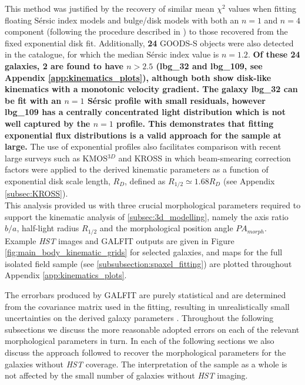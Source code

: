 \documentclass[fleqn,usenatbib]{mnras}
\newcommand{\Sers}{S\'{e}rsic }
\begin{document}
This method was justified by the recovery of similar mean $\chi^{2}$ values when fitting floating \Sers index models and bulge/disk models with both an $n=1$ and $n=4$ component (following the procedure described in \citealt{Bruce2012}) to those recovered from the fixed exponential disk fit.
Additionally, \textbf{24} GOODS-S objects were also detected in the \cite{VanderWel2012} catalogue, for which the median \Sers index value is $n=1.2$.
\textbf{Of these 24 galaxies, 2 are found to have $n>2.5$ (lbg\_32 and lbg\_109, see Appendix \ref{app:kinematics_plots}), although both show disk-like kinematics with a monotonic velocity gradient.
The galaxy lbg\_32 can be fit with an $n=1$ \Sers profile with small residuals, however lbg\_109 has a centrally concentrated light distribution which is not well captured by the $n=1$ profile.
This demonstrates that fitting exponential flux distributions is a valid approach for the sample at large.}
The use of exponential profiles also facilitates comparison with recent large surveys such as KMOS$^{3D}$ \citep{Wisnioski2015} and KROSS \citep{Harrison2017} in which beam-smearing correction factors were applied to the derived kinematic parameters as a function of exponential disk scale length, $R_{D}$, defined as $R_{1/2}\simeq1.68 R_{D}$ (see Appendix \ref{subsec:KROSS}). \\


This analysis provided us with three crucial morphological parameters required to support the kinematic analysis of \cref{subsec:3d_modelling}, namely the axis ratio $b/a$, half-light radius $R_{1/2}$ and the morphological position angle $PA_{morph}$.
Example {\em HST} images and {\scriptsize GALFIT} outputs are given in Figure \ref{fig:main_body_kinematic_grids} for selected galaxies, and maps for the full isolated field sample (see \cref{subsubsection:spaxel_fitting}) are plotted throughout Appendix \ref{app:kinematics_plots}. 

The errorbars produced by {\scriptsize GALFIT} are purely statistical and are determined from the covariance matrix used in the fitting, resulting in unrealistically small uncertainties on the derived galaxy parameters \citep{Hausler2007,Bruce2012}.
Throughout the following subsections we discuss the more reasonable adopted errors on each of the relevant morphological parameters in turn.
In each of the following sections we also discuss the approach followed to recover the morphological parameters for the galaxies without {\em HST} coverage.
The interpretation of the sample as a whole is not affected by the small number of galaxies without {\em HST} imaging.
\end{document}
